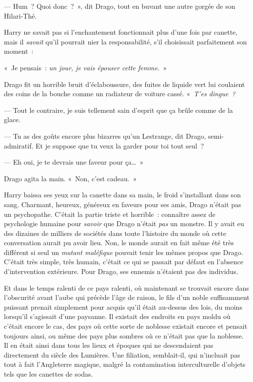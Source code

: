 --- Hum~? Quoi donc~?~», dit Drago, tout en buvant une autre gorgée de son Hilari-Thé.

Harry ne savait pas si l'enchantement fonctionnait plus d'une fois par canette, mais il \emph{savait} qu'il pourrait nier la responsabilité, s'il choisissait parfaitement son moment~:

«~Je pensais~: \emph{un jour, je vais épouser cette femme.}~»

Drago fit un horrible bruit d'éclaboussure, des fuites de liquide vert lui coulaient des coins de la bouche comme un radiateur de voiture cassé.
«~\emph{T'es dingue~?}

--- Tout le contraire, je suis tellement sain d'esprit que ça brûle comme de la glace.

--- Tu as des goûts encore plus bizarres qu'un Lestrange, dit Drago, semi-admiratif.
Et je suppose que tu veux la garder pour toi tout seul~?

--- Eh oui, je te devrais une faveur pour ça…~»

Drago agita la main. «~Non, c'est cadeau.~»

Harry baissa ses yeux sur la canette dans sa main, le froid s'installant dans son sang.
Charmant, heureux, généreux en faveurs pour ses amis, Drago n'était pas un psychopathe.
C'était la partie triste et horrible~: connaître assez de psychologie humaine pour \emph{savoir} que Drago n'était \emph{pas} un monstre.
Il y avait eu des dizaines de milliers de sociétés dans toute l'histoire du monde où cette conversation aurait pu avoir lieu.
Non, le monde aurait en fait même été très différent si seul un \emph{mutant maléfique} pouvait tenir les mêmes propos que Drago.
C'était très simple, très humain, c'était ce qui se passait par défaut en l'absence d'intervention extérieure. Pour Drago, ses ennemis n'étaient pas des individus.

Et dans le temps ralenti de ce pays ralenti, où maintenant se trouvait encore dans l'obscurité avant l'aube qui précède l'âge de raison, le fils d'un noble suffisamment puissant prenait simplement pour acquis qu'il était au-dessus des lois, du moins lorsqu'il s'agissait d'une paysanne.
Il existait des endroits en pays moldu où c'était encore le cas, des pays où cette sorte de noblesse existait encore et pensait toujours ainsi, ou même des pays plus sombres où ce n'était pas que la noblesse.
Il en était ainsi dans tous les lieux et époques qui ne descendaient pas directement du siècle des Lumières.
Une filiation, semblait-il, qui n'incluait pas tout à fait l'Angleterre magique, malgré la contamination interculturelle d'objets tels que les canettes de sodas.




